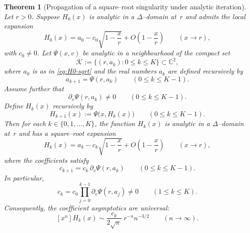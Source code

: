 \documentclass[11pt]{article}
\newtheorem{theorem}{Theorem}
\begin{document}
\begin{theorem}[Propagation of a square--root singularity under analytic iteration]\label{thm:blackbox-sqrt}
Let $r>0$. Suppose $H_0(x)$ is analytic in a $\Delta$--domain at~$r$ and admits the local expansion
\begin{equation}\label{eq:H0-sqrt}
H_0(x)=a_0-c_0\sqrt{1-\frac{x}{r}}+O\!\left(1-\frac{x}{r}\right)\qquad (x\to r),
\end{equation}
with $c_0\neq 0$.
Let $\Psi(x,v)$ be analytic in a neighbourhood of the compact set
\[
\mathcal{K}:=\{(r,a_k):0\le k\le K\}\subset\mathbb{C}^2,
\]
where $a_0$ is as in \eqref{eq:H0-sqrt} and the real numbers $a_k$ are defined recursively by
\begin{equation}\label{eq:ak-rec}
a_{k+1}=\Psi(r,a_k)\qquad (0\le k\le K-1).
\end{equation}
Assume further that
\begin{equation}\label{eq:dPsi-nonzero}
\partial_v\Psi(r,a_k)\neq 0\qquad (0\le k\le K-1).
\end{equation}
Define $H_k(x)$ recursively by
\begin{equation}\label{eq:Hk-rec}
H_{k+1}(x):=\Psi\!\bigl(x,H_k(x)\bigr)\qquad (0\le k\le K-1).
\end{equation}
Then for each $k\in\{0,1,\dots,K\}$, the function $H_k(x)$ is analytic in a $\Delta$--domain at~$r$
and has a square--root expansion
\begin{equation}\label{eq:Hk-sqrt}
H_k(x)=a_k-c_k\sqrt{1-\frac{x}{r}}+O\!\left(1-\frac{x}{r}\right)\qquad (x\to r),
\end{equation}
where the coefficients satisfy
\begin{equation}\label{eq:ck-rec}
c_{k+1}=c_k\,\partial_v\Psi(r,a_k)\qquad (0\le k\le K-1).
\end{equation}
In particular,
\begin{equation}\label{eq:ck-product}
c_k=c_0\prod_{j=0}^{k-1}\partial_v\Psi(r,a_j)\neq 0\qquad (1\le k\le K).
\end{equation}
Consequently, the coefficient asymptotics are universal:
\begin{equation}\label{eq:coeff-asympt}
[x^n]H_k(x)\sim \frac{c_k}{2\sqrt{\pi}}\;r^{-n}n^{-3/2}\qquad (n\to\infty).
\end{equation}
\end{theorem}
\end{document}
